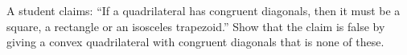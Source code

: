 A student claims: ``If a quadrilateral has congruent diagonals, then it must be a square, a rectangle or an isosceles trapezoid.'' Show that the claim is false by giving a convex quadrilateral with congruent diagonals that is none of these.

